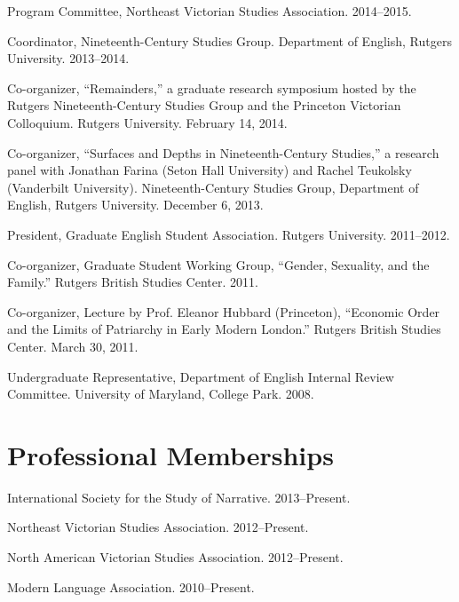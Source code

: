 \documentclass[10pt,letterpaper]{article}
\renewenvironment{itemize}{
  \begin{list}{}{
    \setlength{\leftmargin}{1.5em}
    \setlength{\itemsep}{0.25em}
    \setlength{\parskip}{0pt}
    \setlength{\parsep}{0.25em}
  }
}{
  \end{list}
}
\begin{document}
\begin{itemize}
\item Program Committee, Northeast Victorian Studies Association. 2014--2015.
\item Coordinator, Nineteenth-Century Studies Group. Department of English, Rutgers University. 2013--2014.
\item Co-organizer, ``Remainders,'' a graduate research symposium hosted by the Rutgers Nineteenth-Century Studies Group and the Princeton Victorian Colloquium. Rutgers University. February 14, 2014.
\item Co-organizer, ``Surfaces and Depths in Nineteenth-Century Studies,'' a research panel with Jonathan Farina (Seton Hall University) and Rachel Teukolsky (Vanderbilt University). Nineteenth-Century Studies Group, Department of English, Rutgers University. December 6, 2013.
\item President, Graduate English Student Association. Rutgers University. 2011--2012.
\item Co-organizer, Graduate Student Working Group, ``Gender, Sexuality, and the Family.'' Rutgers British Studies Center. 2011.
\item Co-organizer, Lecture by Prof. Eleanor Hubbard (Princeton), ``Economic Order and the Limits of Patriarchy in Early Modern London.'' Rutgers British Studies Center. March 30, 2011.
\item Undergraduate Representative, Department of English Internal Review Committee. University of Maryland, College Park. 2008.
\end{itemize}


\section*{Professional Memberships}

\begin{itemize}
\item International Society for the Study of Narrative. 2013--Present.
\item Northeast Victorian Studies Association. 2012--Present.
\item North American Victorian Studies Association. 2012--Present.
\item Modern Language Association. 2010--Present.
\end{itemize}

\end{document}
